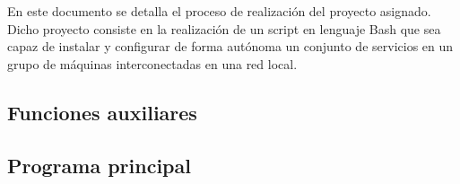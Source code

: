 En este documento se detalla el proceso de realización del proyecto asignado. Dicho proyecto consiste en la realización de un script\cite{enunciado} en lenguaje Bash que sea capaz de instalar y configurar de forma autónoma un conjunto de servicios en un grupo de máquinas interconectadas en una red local.

\subsection{Funciones auxiliares}


\subsection{Programa principal}
